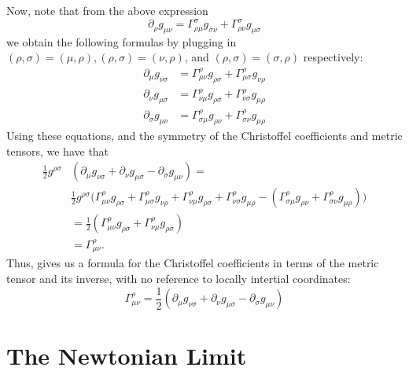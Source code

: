 \documentclass[12pt]{article}
\theoremstyle{definition}
\theoremstyle{remark}
\begin{document}
Now, note that from the above expression 
\[
\partial_{ \rho } g_{ \mu \nu } = \Gamma_{ \rho \mu }^{ \sigma } g_{ \sigma \nu } + \Gamma_{ \rho \nu }^{ \sigma } g_{ \mu \sigma } 
\]
we obtain the following formulas by plugging in $(\rho, \sigma) = (\mu, \rho), (\rho, \sigma) = (\nu, \rho)$, and $(\rho, \sigma) = (\sigma, \rho)$ respectively:
\begin{align*}
\partial_{\mu} g_{ \nu \sigma } 
&= 
\Gamma^{\rho}_{ \mu \nu } g_{ \rho \sigma } 
+
\Gamma^{ \rho}_{ \mu \sigma } g_{ \nu \rho } 
\\
\partial_{ \nu } g_{ \mu \sigma } 
&=
\Gamma^{ \rho }_{ \nu \mu } g_{ \rho \sigma } 
+
\Gamma^{ \rho }_{ \nu \sigma } g_{ \mu \rho } 
\\
\partial_{ \sigma } g_{ \mu \nu } 
&=
\Gamma^{ \rho }_{ \sigma \mu } g_{\rho \nu } 
+
\Gamma^{ \rho }_{ \sigma \nu } g_{ \mu \rho } 
\end{align*}
Using these equations, and the symmetry of the Christoffel coefficients and metric tensors, we have that 
\begin{align*}
\frac{1}{2} g^{ \rho \sigma } &\left( \partial_{ \mu } g_{ \nu \sigma } + \partial_{ \nu } g_{ \mu \sigma } - \partial_{ \sigma } g_{ \mu \nu } \right) = \\
& \frac{ 1}{2} g^{ \rho \sigma } \Big( \Gamma^{\rho}_{ \mu \nu } g_{ \rho \sigma } 
+
\Gamma^{ \rho}_{ \mu \sigma } g_{ \nu \rho } 
+ 
\Gamma^{ \rho }_{ \nu \mu } g_{ \rho \sigma } 
+
\Gamma^{ \rho }_{ \nu \sigma } g_{ \mu \rho } 
-
\left( \Gamma^{ \rho }_{ \sigma \mu } g_{\rho \nu } 
+
\Gamma^{ \rho }_{ \sigma \nu } g_{ \mu \rho } 
\right) \Big) \\
&= \frac{1}{2} \left( \Gamma^{ \rho }_{ \mu \nu } g_{ \rho \sigma } + \Gamma^{ \rho }_{ \nu \mu } g_{ \rho \sigma } \right)  \\
&=  \Gamma^{ \rho }_{ \mu \nu }.
\end{align*}
Thus, gives us a formula for the Christoffel coefficients in terms of the metric tensor and its inverse, with no reference to locally intertial coordinates:
\[
\Gamma_{ \mu \nu }^{ \rho } = \frac{1}{2} \left( \partial_{ \mu } g_{ \nu \sigma } + \partial_{ \nu } g_{ \mu \sigma } - \partial_{ \sigma } g_{ \mu \nu } \right) 
\]







\section{The Newtonian Limit}
\end{document}
